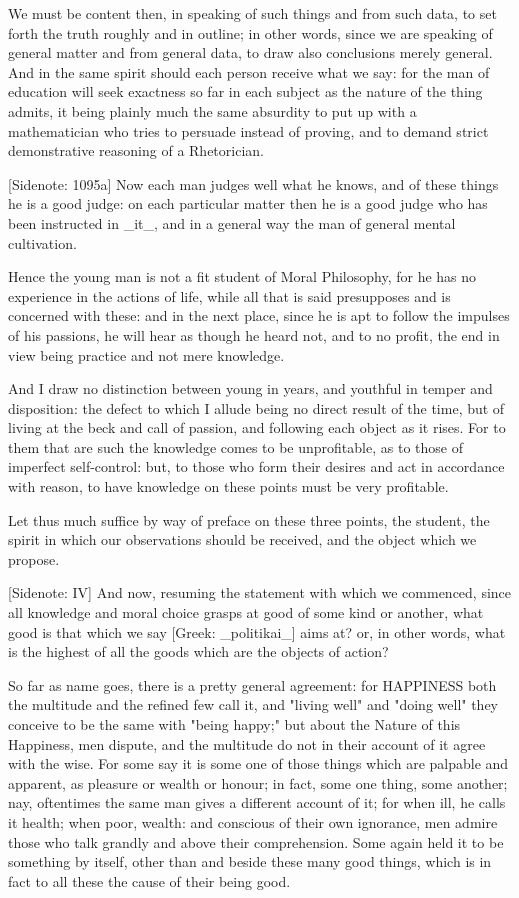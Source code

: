 We must be content then, in speaking of such things and from such data,
to set forth the truth roughly and in outline; in other words, since
we are speaking of general matter and from general data, to draw also
conclusions merely general. And in the same spirit should each person
receive what we say: for the man of education will seek exactness so far
in each subject as the nature of the thing admits, it being plainly much
the same absurdity to put up with a mathematician who tries to persuade
instead of proving, and to demand strict demonstrative reasoning of a
Rhetorician.

[Sidenote: 1095a] Now each man judges well what he knows, and of these
things he is a good judge: on each particular matter then he is a good
judge who has been instructed in _it_, and in a general way the man of
general mental cultivation.

Hence the young man is not a fit student of Moral Philosophy, for he has
no experience in the actions of life, while all that is said presupposes
and is concerned with these: and in the next place, since he is apt to
follow the impulses of his passions, he will hear as though he heard
not, and to no profit, the end in view being practice and not mere
knowledge.

And I draw no distinction between young in years, and youthful in temper
and disposition: the defect to which I allude being no direct result of
the time, but of living at the beck and call of passion, and following
each object as it rises. For to them that are such the knowledge comes
to be unprofitable, as to those of imperfect self-control: but, to
those who form their desires and act in accordance with reason, to have
knowledge on these points must be very profitable.

Let thus much suffice by way of preface on these three points, the
student, the spirit in which our observations should be received, and
the object which we propose.

[Sidenote: IV] And now, resuming the statement with which we commenced,
since all knowledge and moral choice grasps at good of some kind or
another, what good is that which we say [Greek: _politikai_] aims at?
or, in other words, what is the highest of all the goods which are the
objects of action?

So far as name goes, there is a pretty general agreement: for HAPPINESS
both the multitude and the refined few call it, and "living well" and
"doing well" they conceive to be the same with "being happy;" but about
the Nature of this Happiness, men dispute, and the multitude do not in
their account of it agree with the wise. For some say it is some one of
those things which are palpable and apparent, as pleasure or wealth or
honour; in fact, some one thing, some another; nay, oftentimes the same
man gives a different account of it; for when ill, he calls it health;
when poor, wealth: and conscious of their own ignorance, men admire
those who talk grandly and above their comprehension. Some again held it
to be something by itself, other than and beside these many good things,
which is in fact to all these the cause of their being good.

